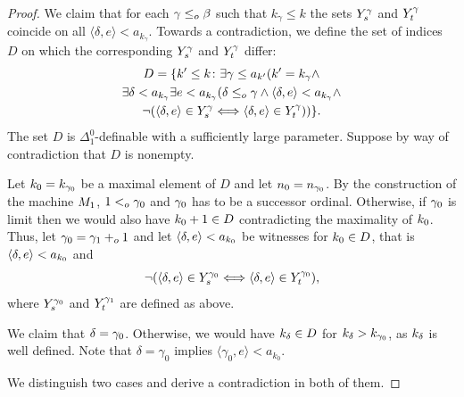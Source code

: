 \documentclass[11pt]{amsart}
\theoremstyle{definition}
\theoremstyle{remark}
\theoremstyle{plain}
\def\la{\langle}
\def\ra{\rangle}
\newcommand{\leo}{<\sb{o}}
\newcommand{\leqo}{\leq\sb{o}}
\newcommand{\pluso}{+\sb{o}}
\def\ifff{\Longleftrightarrow}
\newcommand{\lorenzo}[1]{\textcolor{blue}{#1}}
\newcommand{\andrea}[1]{\textcolor{green}{#1}}
\begin{document}
\begin{proof}
We claim that for each $\gamma \leqo \beta$ such that $k_\gamma \leq k$ the sets $Y\sp {\gamma}\sb{s}$ and $Y\sp{\gamma}\sb{t}$ coincide on all $\langle \delta, e\rangle < a_{k_\gamma}$.
Towards a contradiction, we define the set of indices $D$ on which the corresponding $Y\sp {\gamma}\sb{s}$ and $Y\sp{\gamma}\sb{t}$ differ:
\begin{multline*}
D=\{k'\leq k\colon \exists \gamma\leq a\sb{k'} 
(k'=k\sb\gamma  \land  \\
\exists \delta<a\sb{k\sb\gamma}\exists e<a\sb{k\sb\gamma}(\delta\leqo\gamma\land
\la\delta,e\ra<a\sb {k\sb\gamma} \land  \\
\neg(\la\delta,e\ra\in Y\sp{\gamma}\sb{s} \ifff \la\delta,e\ra\in Y\sp{\gamma}\sb{t}))\}.
\end{multline*}
The set $D$ is $\Delta^0_1$-definable with a sufficiently large parameter. Suppose by way of contradiction that $D$ is nonempty.

Let $k\sb0=k\sb{\gamma\sb0}$ be a maximal element of $D$ and let $n\sb0=n\sb{\gamma\sb0}$.
By the construction of the machine $M\sb{1}$,  $1\leo \gamma\sb0$ and $\gamma\sb0$ has to be a successor ordinal.
Otherwise, if $\gamma\sb0$ is limit then we would also have $k\sb0+1\in D$ contradicting the maximality of $k\sb0$. 
Thus, let $\gamma\sb0=\gamma\sb 1\pluso 1$ and let $\la\delta,e\ra<a\sb{k\sb0}$ be witnesses for $k\sb0\in D$, that is $\la\delta,e\ra<a\sb{k\sb0}$ and 
$$
\neg(\la\delta,e\ra\in Y\sp{\gamma\sb0}\sb{s} \ifff \la\delta,e\ra\in Y\sp{\gamma\sb0}\sb{t}),
$$
where $Y\sp{\gamma\sb 0}\sb{s}$ and $Y\sp{\gamma\sb 1}\sb{t}$ are defined as above. 

We claim that $\delta=\gamma\sb0$. 
Otherwise, we would have $k\sb{\delta}\in D$ for $k\sb\delta>k\sb{\gamma\sb0}$, as $k\sb\delta$ is well defined. Note that $\delta = \gamma_0$ implies $\langle \gamma_0, e\rangle < a_{k_0}$.

We distinguish two cases and derive a contradiction in both of them. 



\smallskip


\end{proof}
\end{document}
